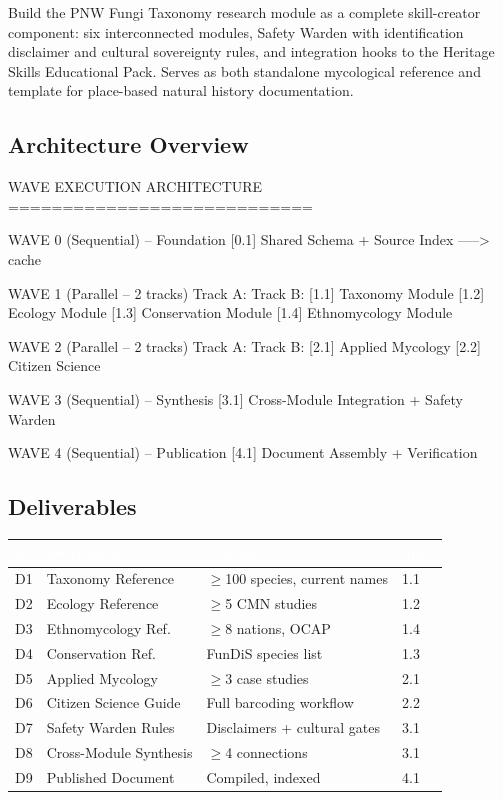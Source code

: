 \documentclass[11pt,letterpaper]{article}
\newcommand{\tableheader}[1]{\textbf{\sffamily\textcolor{white}{#1}}}
\begin{document}
Build the PNW Fungi Taxonomy research module as a complete skill-creator component: six interconnected modules, Safety Warden with identification disclaimer and cultural sovereignty rules, and integration hooks to the Heritage Skills Educational Pack. Serves as both standalone mycological reference and template for place-based natural history documentation.

\subsection{Architecture Overview}

\begin{asciibox}
WAVE EXECUTION ARCHITECTURE
============================

WAVE 0 (Sequential) -- Foundation
  [0.1] Shared Schema + Source Index -----> cache

WAVE 1 (Parallel -- 2 tracks)
  Track A:                    Track B:
  [1.1] Taxonomy Module       [1.2] Ecology Module
  [1.3] Conservation Module   [1.4] Ethnomycology Module

WAVE 2 (Parallel -- 2 tracks)
  Track A:                    Track B:
  [2.1] Applied Mycology      [2.2] Citizen Science

WAVE 3 (Sequential) -- Synthesis
  [3.1] Cross-Module Integration + Safety Warden

WAVE 4 (Sequential) -- Publication
  [4.1] Document Assembly + Verification
\end{asciibox}

\subsection{Deliverables}

\begin{center}
\begin{tabularx}{\textwidth}{C{0.7cm}L{3cm}XL{1.5cm}}
\toprule
{}
\tableheader{\#} & \tableheader{Deliverable} & \tableheader{Criteria} & \tableheader{Spec} \\
\midrule
D1 & Taxonomy Reference & $\geq$100 species, current names & 1.1 \\
D2 & Ecology Reference & $\geq$5 CMN studies & 1.2 \\
D3 & Ethnomycology Ref. & $\geq$8 nations, OCAP & 1.4 \\
D4 & Conservation Ref. & FunDiS species list & 1.3 \\
D5 & Applied Mycology & $\geq$3 case studies & 2.1 \\
D6 & Citizen Science Guide & Full barcoding workflow & 2.2 \\
D7 & Safety Warden Rules & Disclaimers + cultural gates & 3.1 \\
D8 & Cross-Module Synthesis & $\geq$4 connections & 3.1 \\
D9 & Published Document & Compiled, indexed & 4.1 \\
\bottomrule
\end{tabularx}
\end{center}
\end{document}
